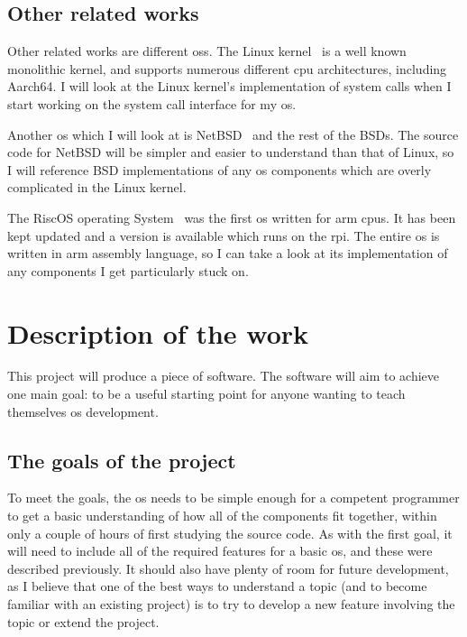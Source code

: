 \documentclass{article}
\begin{document}
\begin{refsection}
\subsection{Other related works}

Other related works are different \glspl{os}. The Linux
kernel~\cite{linux-kernel-git} is a well known monolithic kernel, and supports
numerous different \gls{cpu} architectures, including Aarch64. I will look at
the Linux kernel's implementation of system calls when I start working on the
system call interface for my \gls{os}.

Another \gls{os} which I will look at is NetBSD~\cite{netBSD-git} and the rest
of the BSDs. The source code for NetBSD will be simpler and easier to
understand than that of Linux, so I will reference BSD implementations of any
\gls{os} components which are overly complicated in the Linux kernel.

The RiscOS operating System~\cite{riscOS-source} was the first \gls{os} written
for \gls{arm} \glspl{cpu}. It has been kept updated and a version is available
which runs on the \gls{rpi}. The entire \gls{os} is written in \gls{arm}
assembly language, so I can take a look at its implementation of any components
I get particularly stuck on.

\printbibliography[heading=relworks]

\end{refsection}

\section{Description of the work}
This project will produce a piece of software. The software will aim to achieve
one main goal: to be a useful starting point for anyone
wanting to teach themselves \gls{os} development.

\subsection{The goals of the project}
To meet the goals, the \gls{os} needs to be simple enough for a competent
programmer to get a basic understanding of how all of the components fit
together, within only a couple of hours of first studying the source code. As
with the first goal, it will need to include all of the required features for a
basic \gls{os}, and these were described previously. It should also have plenty
of room for future development, as I believe that one of the best ways to
understand a topic (and to become familiar with an existing project) is to try
to develop a new feature involving the topic or extend the project.
\end{document}
